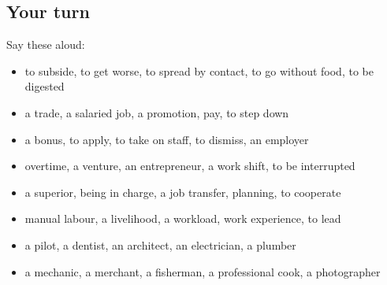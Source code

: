 \subsection*{Your turn}
Say these aloud:

\begin{itemize}
\raggedright
  \item to subside, to get worse, to spread by contact, to go without food, to be digested
  \item a trade, a salaried job, a promotion, pay, to step down
  \item a bonus, to apply, to take on staff, to dismiss, an employer
  \item overtime, a venture, an entrepreneur, a work shift, to be interrupted
  \item a superior, being in charge, a job transfer, planning, to cooperate
  \item manual labour, a livelihood, a workload, work experience, to lead
  \item a pilot, a dentist, an architect, an electrician, a plumber
  \item a mechanic, a merchant, a fisherman, a professional cook, a photographer
\end{itemize}

